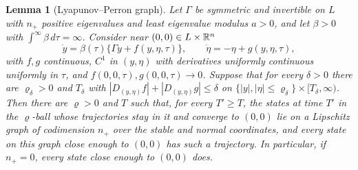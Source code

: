 \documentclass{article} %
\theoremstyle{plain}
\newtheorem{lemma}[theorem]{Lemma}
\theoremstyle{definition}
\theoremstyle{remark}
\begin{document}
\begin{lemma}[Lyapunov--Perron graph]
\label{lem:lp}
Let $\Gamma$ be symmetric and invertible on $L$ with $n_+$ positive eigenvalues and least
eigenvalue modulus $a>0$, and let $\beta>0$ with $\int^\infty\beta\,d\tau=\infty$. Consider near
$(0,0)\in L\times\mathbb{R}^n$
\[
\dot y=\beta(\tau)\{\Gamma y+f(y,\eta,\tau)\},\qquad \dot\eta=-\eta+g(y,\eta,\tau),
\]
with $f,g$ continuous, $C^1$ in $(y,\eta)$ with derivatives uniformly continuous uniformly in
$\tau$, and $f(0,0,\tau),g(0,0,\tau)\to0$. Suppose that for every $\delta>0$ there are
$\varrho_\delta>0$ and $T_\delta$ with $|D_{(y,\eta)}f|+|D_{(y,\eta)}g|\le\delta$ on
$\{|y|,|\eta|\le\varrho_\delta\}\times[T_\delta,\infty)$. Then there are $\varrho>0$ and $T$
such that, for every $T'\ge T$, the states at time $T'$ in the $\varrho$-ball whose trajectories
stay in it and converge to $(0,0)$ lie on a Lipschitz graph of codimension $n_+$ over the stable and
normal coordinates, and every state on this graph close enough to $(0,0)$ has such a trajectory.
In particular, if $n_+=0$, every state close enough to $(0,0)$ does.
\end{lemma}
\end{document}
